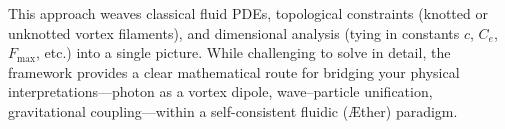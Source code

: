 This approach weaves classical fluid PDEs, topological constraints (knotted or unknotted vortex filaments), and dimensional analysis (tying in constants \(c\), \(C_e\), \(F_{\text{max}}\), etc.) into a single picture. While challenging to solve in detail, the framework provides a clear mathematical route for bridging your physical interpretations—photon as a vortex dipole, wave–particle unification, gravitational coupling—within a self-consistent fluidic (Æther) paradigm.